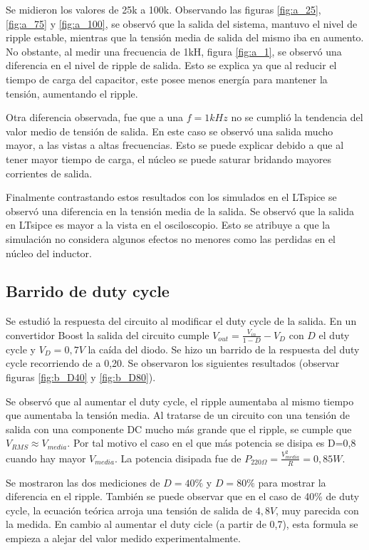 Se midieron los valores de 25k a 100k. Observando las figuras \ref{fig:a_25}, \ref{fig:a_75} y \ref{fig:a_100}, se observó que la salida del sistema, mantuvo el nivel de ripple estable, mientras que la tensión media de salida del mismo iba en aumento. No obstante, al medir una frecuencia de 1kH, figura \ref{fig:a_1}, se observó una diferencia en el nivel de ripple de salida. Esto se explica ya que al reducir el tiempo de carga del capacitor, este posee menos energía para mantener la tensión, aumentando el ripple. \par
Otra diferencia observada, fue que a una $f = 1kHz$ no se cumplió la tendencia del valor medio de tensión de salida. En este caso se observó una salida mucho mayor, a las vistas a altas frecuencias. Esto se puede explicar debido a que al tener mayor tiempo de carga, el núcleo se puede saturar bridando mayores corrientes de salida.\par

Finalmente contrastando estos resultados con los simulados en el LTspice se observó una diferencia en la tensión media de la salida. Se observó que la salida en LTsipce es mayor a la vista en el osciloscopio. Esto se atribuye a que la simulación no considera algunos efectos no menores como las perdidas en el núcleo del inductor.

\subsection{Barrido de duty cycle}

Se estudió la respuesta del circuito al modificar el duty cycle de la salida. En un convertidor Boost la salida del circuito cumple $V_{out} = \frac{V_{in}}{1-D} - V_D$ con $D$ el duty cycle y $V_D = 0,7V$ la caída del diodo. Se hizo un barrido de la respuesta del duty cycle recorriendo de a 0,20. Se observaron los siguientes resultados (observar figuras \ref{fig:b_D40} y          \ref{fig:b_D80}). \par

Se observó que al aumentar el duty cycle, el ripple aumentaba al mismo tiempo que aumentaba la tensión media. Al tratarse de un circuito con una tensión de salida con una componente DC mucho más grande que el ripple, se cumple que $V_{RMS} \approx V_{media}$. Por tal motivo el caso en el que más potencia se disipa es D=0,8 cuando hay mayor $V_{media}$. La potencia disipada fue de $P_{220\Omega}= \frac{V_{media}^2}{R} = 0,85W$.\par

Se mostraron las dos mediciones de $D= 40\%$ y $D=80\%$ para mostrar la diferencia en el ripple. También se puede observar que en el caso de 40\% de duty cycle, la ecuación teórica arroja una tensión de salida de $4,8 V$, muy parecida con la medida. En cambio al aumentar el duty cicle (a partir de 0,7), esta formula se empieza a alejar del valor medido experimentalmente.
